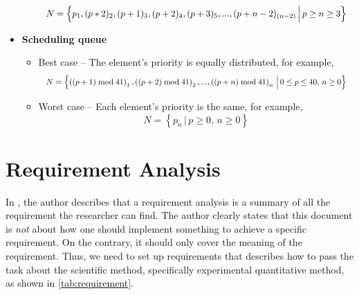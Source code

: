 \documentclass[a4paper,11pt]{kth-mag}
\begin{document}
\begin{itemize}
\begin{itemize}
                \begin{equation*}
                    \resizebox{.9\hsize}{!}{$N = \left\{p_1, (p*2)_2, (p+1)_3, (p+2)_4, (p+3)_5,..., (p+n-2)_{(n-2)} \, \Big| \, p \ge n \ge 3 \right\}$}
                \end{equation*}
        \end{itemize}
    \item \textbf{Scheduling queue}
        \begin{itemize}
            \item Best case -- The element's priority is equally distributed, for example,
                \begin{equation*}
                    \resizebox{.9\hsize}{!}{$N = \left\{\left((p+1) \bmod 41\right)_1, \left((p+2) \bmod 41\right)_2,..., \left((p+n) \bmod 41\right)_n \, \Big| \, 0 \le p \le 40, \, n \ge 0\right\}$}
                \end{equation*}
            \item Worst case -- Each element's priority is the same, for example,
                \begin{equation*}
                    N = \left\{p_{n} \, \Big| \, p \ge 0,\, n \ge 0 \right\}
                \end{equation*}
        \end{itemize}
\end{itemize}





\appendix
\addappheadtotoc
\chapter{Requirement Analysis}\label{app:A}

In \cite{web:requirementoverview}, the author describes that a requirement analysis is a summary of all the requirement the researcher can find.
The author clearly states that this document is \emph{not} about how one should implement something to achieve a specific requirement.
On the contrary, it should only cover the meaning of the requirement.
Thus, we need to set up requirements that describes how to pass the task about the scientific method, specifically experimental quantitative method, as shown in \cref{tab:requirement}.
\end{document}
